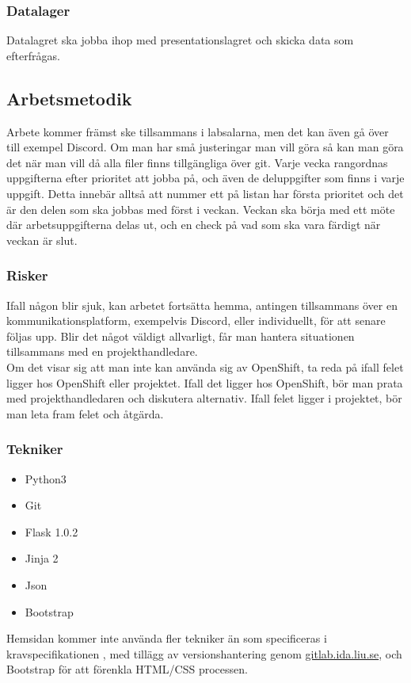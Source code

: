 \documentclass{TDP003mall}
\begin{document}
\subsubsection{Datalager}
Datalagret ska jobba ihop med presentationslagret och skicka data som efterfrågas.
\subsection{Arbetsmetodik}
Arbete kommer främst ske tillsammans i labsalarna, men det kan även gå över till exempel Discord. Om man har små justeringar man vill göra så kan man göra det när man vill då alla filer finns tillgängliga över git. Varje vecka rangordnas uppgifterna efter prioritet att jobba på, och även de deluppgifter som finns i varje uppgift. Detta innebär alltså att nummer ett på listan har första prioritet och det är den delen som ska jobbas med först i veckan. Veckan ska börja med ett möte där arbetsuppgifterna delas ut, och en check på vad som ska vara färdigt när veckan är slut.
\subsubsection{Risker}
Ifall någon blir sjuk, kan arbetet fortsätta hemma, antingen tillsammans över en kommunikationsplatform, exempelvis Discord, eller individuellt,
för att senare följas upp. Blir det något väldigt allvarligt, får man hantera situationen tillsammans med en projekthandledare.\\
Om det visar sig att man inte kan använda sig av OpenShift, ta reda på ifall felet ligger hos OpenShift eller projektet. Ifall det ligger hos OpenShift, bör man prata med projekthandledaren och diskutera alternativ. Ifall felet ligger i projektet, bör man leta fram felet och åtgärda.
\subsubsection{Tekniker}
\begin{itemize}
    \item Python3
    \item Git
    \item Flask 1.0.2
    \item Jinja 2
    \item Json
    \item Bootstrap
\end{itemize}
Hemsidan kommer inte använda fler tekniker än som specificeras i kravspecifikationen , med tillägg av versionshantering genom \url{gitlab.ida.liu.se}, och Bootstrap för att förenkla HTML/CSS processen.
\end{document}
